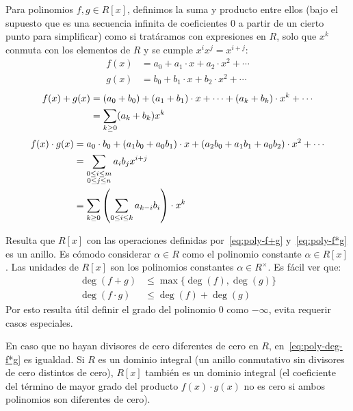   \begin{definition}
    Para polinomios \(f, g \in R[x]\),
    definimos la suma y producto entre ellos
    (bajo el supuesto
     que es una secuencia infinita de coeficientes \(0\)
     a partir de un cierto punto para simplificar)
    como si tratáramos con expresiones en \(R\),
    solo que \(x^k\) conmuta con los elementos de \(R\)
    y se cumple \(x^i x^j = x^{i + j}\):
    \begin{align}
      f(x)
	 &= a_0 + a_1 \cdot x + a_2 \cdot x^2 + \dotsb
	   \label{eq:poly-f} \\
      g(x)
	 &= b_0 + b_1 \cdot x + b_2 \cdot x^2 + \dotsb
	   \label{eq:poly-g}
    \end{align}
    \begin{align}
      f(x) + g(x)
	 &= (a_0 + b_0)
	      + (a_1 + b_1) \cdot x
	      + \dotsb
	      + (a_k + b_k) \cdot x^k
	      + \dotsb \notag \\
	 &= \sum_{k  \ge 0} (a_ k + b_k) x^k \label{eq:poly-f+g}
    \end{align}
    \begin{align}
      f(x) \cdot g(x)
	 &= a_0 \cdot b_0
	      + (a_1 b_0 + a_0 b_1) \cdot x
	      + (a_2 b_0 + a_1 b_1 + a_0 b_2) \cdot x^2
	      + \dotsb \notag \\
	 &= \sum_{\substack{0 \le i \le m \\
			    0 \le j \le n
		 }} a_i b_j x^{i + j} \notag \\
	 &= \sum_{k \ge 0}
	      \left(
		\sum_{0 \le i \le k} a_{k - i} b_i
	      \right) \cdot x^k \label{eq:poly-f*g}
    \end{align}
  \end{definition}
  Resulta que \(R[x]\) con las operaciones
  definidas por~\eqref{eq:poly-f+g} y~\eqref{eq:poly-f*g}
  es un anillo.%
  Es cómodo considerar \(\alpha \in R\)
  como el polinomio constante \(\alpha \in R[x]\).
  Las unidades de \(R[x]\) son los polinomios constantes
  \(\alpha \in R^\times\).
  Es fácil ver que:
  \begin{align}
    \deg(f + g)
      &\le \max\{\deg(f), \deg(g)\} \label{eq:poly-deg-f+g} \\
    \deg(f \cdot g)
      &\le \deg(f) + \deg(g)	    \label{eq:poly-deg-f*g}
  \end{align}
  Por esto resulta útil definir el grado del polinomio \(0\)
  como \(-\infty\),
  evita requerir casos especiales.

  En caso que no hayan divisores de cero
  diferentes de cero en \(R\),
  en~\eqref{eq:poly-deg-f*g} es igualdad.
  Si \(R\) es un dominio integral
  (un anillo conmutativo sin divisores de cero distintos de cero),
  \(R[x]\) también es un dominio integral
  (el coeficiente del término de mayor grado
   del producto \(f(x) \cdot g(x)\)
   no es cero si ambos polinomios son diferentes de cero).

